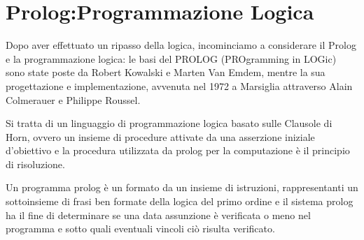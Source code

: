 \documentclass[a4paper]{report}
\begin{document}
\chapter{Prolog:Programmazione Logica}
Dopo aver effettuato un ripasso della logica, incominciamo a considerare il Prolog e la programmazione logica:
le basi del PROLOG (PROgramming in LOGic) sono state poste da Robert Kowalski e Marten Van Emdem, mentre la sua progettazione e implementazione,
avvenuta nel 1972 a Marsiglia attraverso Alain Colmerauer e Philippe Roussel.

Si tratta di un linguaggio di programmazione logica basato sulle Clausole di Horn, ovvero un insieme di procedure attivate
da una asserzione iniziale d’obiettivo e la procedura utilizzata da prolog per la computazione è il principio di risoluzione.

Un programma prolog è un formato da un insieme di istruzioni, rappresentanti un sottoinsieme di frasi ben formate della logica del primo ordine
e il sistema prolog ha il fine di determinare se una data assunzione è verificata o meno nel programma e sotto quali eventuali vincoli
ciò risulta  verificato.
\end{document}
